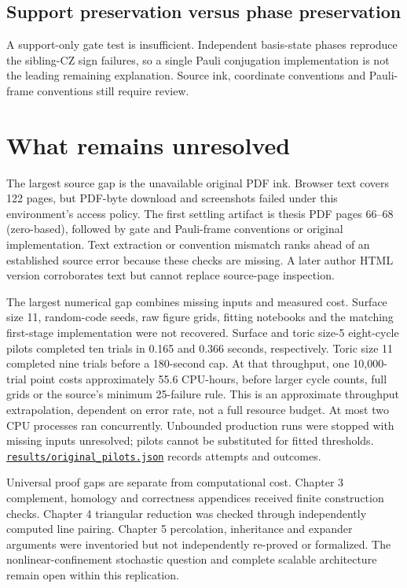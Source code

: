 \documentclass[11pt]{article}
\begin{document}
\subsection{Support preservation versus phase preservation}
A support-only gate test is insufficient. Independent basis-state phases reproduce the sibling-CZ sign failures, so a single Pauli conjugation implementation is not the leading remaining explanation. Source ink, coordinate conventions and Pauli-frame conventions still require review.

\section{What remains unresolved}
The largest source gap is the unavailable original PDF ink. Browser text covers 122 pages, but PDF-byte download and screenshots failed under this environment's access policy. The first settling artifact is thesis PDF pages 66--68 (zero-based), followed by gate and Pauli-frame conventions or original implementation. Text extraction or convention mismatch ranks ahead of an established source error because these checks are missing. A later author HTML version corroborates text but cannot replace source-page inspection.

The largest numerical gap combines missing inputs and measured cost. Surface size 11, random-code seeds, raw figure grids, fitting notebooks and the matching first-stage implementation were not recovered. Surface and toric size-5 eight-cycle pilots completed ten trials in 0.165 and 0.366 seconds, respectively. Toric size 11 completed nine trials before a 180-second cap. At that throughput, one 10,000-trial point costs approximately 55.6 CPU-hours, before larger cycle counts, full grids or the source's minimum 25-failure rule. This is an approximate throughput extrapolation, dependent on error rate, not a full resource budget. At most two CPU processes ran concurrently. Unbounded production runs were stopped with missing inputs unresolved; pilots cannot be substituted for fitted thresholds. \href{https://github.com/alectionary/vibe-math/blob/master/formalization/quintavalle-hgp/results/original_pilots.json}{\nolinkurl{results/original_pilots.json}} records attempts and outcomes.

Universal proof gaps are separate from computational cost. Chapter 3 complement, homology and correctness appendices received finite construction checks. Chapter 4 triangular reduction was checked through independently computed line pairing. Chapter 5 percolation, inheritance and expander arguments were inventoried but not independently re-proved or formalized. The nonlinear-confinement stochastic question and complete scalable architecture remain open within this replication.
\end{document}
